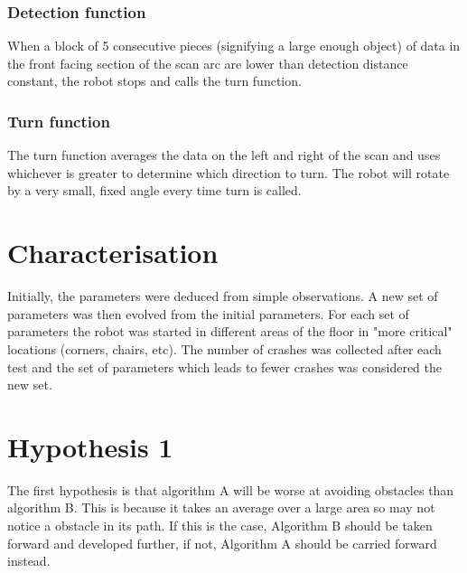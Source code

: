 \documentclass[letterpaper, 10 pt, conference]{ieeeconf}  %
\begin{document}
\subsubsection{Detection function}
When a block of 5 consecutive pieces (signifying a large enough object) of data in the front facing section of the scan arc are lower than detection distance constant, the robot stops and calls the turn function.

\subsubsection{Turn function}
The turn function averages the data on the left and right of the scan and uses whichever is greater to determine which direction to turn. The robot will rotate by a very small, fixed angle every time turn is called. 

\section{Characterisation}
Initially, the parameters were deduced from simple observations. A new set of parameters was then evolved from the initial parameters. For each set of parameters the robot was started in different areas of the floor in "more critical" locations (corners, chairs, etc). The number of crashes was collected after each test and the set of parameters which leads to fewer crashes was considered the new set.

\section{Hypothesis 1}
The first hypothesis is that algorithm A will be worse at avoiding obstacles than algorithm B. This is because it takes an average over a large area so may not notice a obstacle in its path. If this is the case, Algorithm B should be taken forward and developed further, if not, Algorithm A should be carried forward instead.
\end{document}
